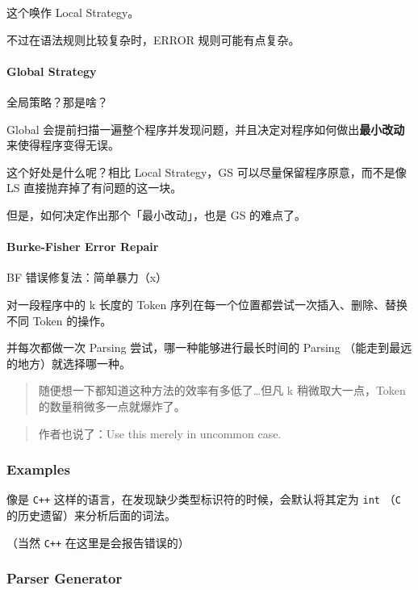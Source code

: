 \documentclass[
]{article}
\begin{document}
这个唤作 Local Strategy。

不过在语法规则比较复杂时，ERROR 规则可能有点复杂。

\hypertarget{header-n23}{%
\paragraph{Global Strategy}\label{header-n23}}

全局策略？那是啥？

Global
会提前扫描一遍整个程序并发现问题，并且决定对程序如何做出\textbf{最小改动}来使得程序变得无误。

这个好处是什么呢？相比 Local Strategy，GS 可以尽量保留程序原意，而不是像
LS 直接抛弃掉了有问题的这一块。

但是，如何决定作出那个「最小改动」，也是 GS 的难点了。

\hypertarget{header-n28}{%
\paragraph{Burke-Fisher Error Repair}\label{header-n28}}

BF 错误修复法：简单暴力（x）

对一段程序中的 k 长度的 Token
序列在每一个位置都尝试一次插入、删除、替换不同 Token 的操作。

并每次都做一次 Parsing 尝试，哪一种能够进行最长时间的 Parsing
（能走到最远的地方）就选择哪一种。

\begin{quote}
随便想一下都知道这种方法的效率有多低了\ldots 但凡 k 稍微取大一点，Token
的数量稍微多一点就爆炸了。
\end{quote}

\begin{quote}
作者也说了：Use this merely in uncommon case.
\end{quote}

\hypertarget{header-n36}{%
\subsubsection{Examples}\label{header-n36}}

像是 \texttt{C++} 这样的语言，在发现缺少类型标识符的时候，会默认将其定为
\texttt{int} （\texttt{C} 的历史遗留）来分析后面的词法。

（当然 \texttt{C++} 在这里是会报告错误的）

\hypertarget{header-n39}{%
\subsubsection{Parser Generator}\label{header-n39}}
\end{document}

